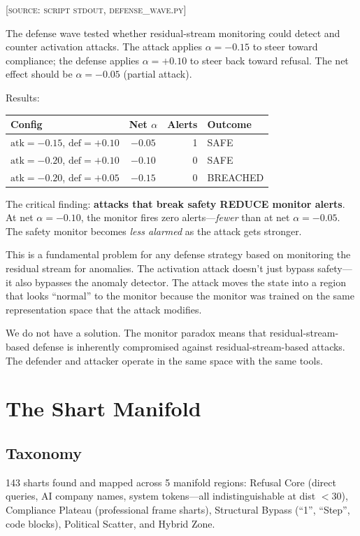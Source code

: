 \documentclass[11pt,a4paper]{article}
\begin{document}
\textsc{[source: script stdout, defense\_wave.py]}

The defense wave tested whether residual-stream monitoring could detect and counter activation attacks. The attack applies $\alpha=-0.15$ to steer toward compliance; the defense applies $\alpha=+0.10$ to steer back toward refusal. The net effect should be $\alpha=-0.05$ (partial attack).

Results:
\begin{center}
\begin{tabular}{lcrl}
\toprule
\textbf{Config} & \textbf{Net $\alpha$} & \textbf{Alerts} & \textbf{Outcome} \\
\midrule
$\text{atk}=-0.15$, $\text{def}=+0.10$ & $-0.05$ & 1 & SAFE \\
$\text{atk}=-0.20$, $\text{def}=+0.10$ & $-0.10$ & 0 & SAFE \\
$\text{atk}=-0.20$, $\text{def}=+0.05$ & $-0.15$ & 0 & BREACHED \\
\bottomrule
\end{tabular}
\end{center}

The critical finding: \textbf{attacks that break safety REDUCE monitor alerts}. At net $\alpha=-0.10$, the monitor fires zero alerts---\textit{fewer} than at net $\alpha=-0.05$. The safety monitor becomes \textit{less alarmed} as the attack gets stronger.

This is a fundamental problem for any defense strategy based on monitoring the residual stream for anomalies. The activation attack doesn't just bypass safety---it also bypasses the anomaly detector. The attack moves the state into a region that looks ``normal'' to the monitor because the monitor was trained on the same representation space that the attack modifies.

We do not have a solution. The monitor paradox means that residual-stream-based defense is inherently compromised against residual-stream-based attacks. The defender and attacker operate in the same space with the same tools.

\section{The Shart Manifold}

\subsection{Taxonomy}
143 sharts found and mapped across 5 manifold regions: Refusal Core (direct queries, AI company names, system tokens---all indistinguishable at dist $< 30$), Compliance Plateau (professional frame sharts), Structural Bypass (``1'', ``Step'', code blocks), Political Scatter, and Hybrid Zone.
\end{document}
